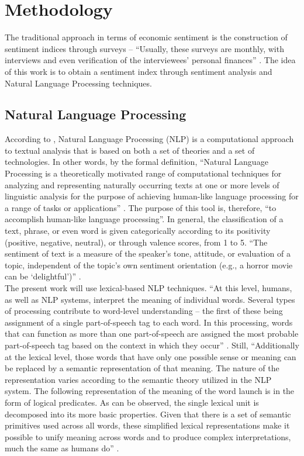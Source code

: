 \chapter{\textbf{Methodology}} \label{cap:methodology}

The traditional approach in terms of economic sentiment is the construction of sentiment indices through surveys \cite[p.4]{shapiro2020measuring} -- ``Usually, these surveys are monthly, with interviews and even verification of the interviewees' personal finances'' \cite[p. 5]{shapiro2020measuring}. The idea of this work is to obtain a sentiment index through sentiment analysis and Natural Language Processing techniques.

\section{Natural Language Processing}

According to \cite{liddy2001natural}, Natural Language Processing (NLP) is a computational approach to textual analysis that is based on both a set of theories and a set of technologies. In other words, by the formal definition, ``Natural Language Processing is a theoretically motivated range of computational techniques for analyzing and representing naturally occurring texts at one or more levels of linguistic analysis for the purpose of achieving human-like language processing for a range of tasks or applications'' \cite[p. 2]{liddy2001natural}. The purpose of this tool is, therefore, ``to accomplish human-like language processing''. In general, the classification of a text, phrase, or even word is given categorically according to its positivity (positive, negative, neutral), or through valence scores, from 1 to 5. ``The sentiment of text is a measure of the speaker's tone, attitude, or evaluation of a topic, independent of the topic's own sentiment orientation (e.g., a horror movie can be `delightful')'' \cite[p. 5]{shapiro2020measuring}.\\

The present work will use lexical-based NLP techniques. ``At this level, humans, as well as NLP systems, interpret the meaning of individual words. Several types of processing contribute to word-level understanding – the first of these being assignment of a single part-of-speech tag to each word. In this processing, words that can function as more than one part-of-speech are assigned the most probable part-of-speech tag based on the context in which they occur'' \cite[p.7]{liddy2001natural}. Still, ``Additionally at the lexical level, those words that have only one possible sense or meaning can be replaced by a semantic representation of that meaning. The nature of the representation varies according to the semantic theory utilized in the NLP system. The following representation of the meaning of the word launch is in the form of logical predicates. As can be observed, the single lexical unit is decomposed into its more basic properties. Given that there is a set of semantic primitives used across all words, these simplified lexical representations make it possible to unify meaning across words and to produce complex interpretations, much the same as humans do'' \cite[p.7]{liddy2001natural}.\\

